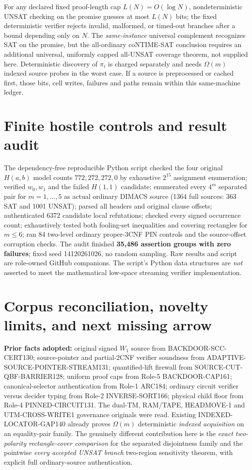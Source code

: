 \documentclass[11pt]{article}
\begin{document}
For any declared fixed proof-length cap $L(N)=O(\log N)$, nondeterministic UNSAT checking on the promise guesses at most $L(N)$ bits; the fixed deterministic verifier rejects invalid, malformed, or timed-out branches after a bound depending only on $N$. The \emph{same-instance} universal complement recognizes SAT on the promise, but the all-ordinary coNTIME-SAT conclusion requires an additional universal, uniformly capped all-UNSAT coverage theorem, not supplied here. Deterministic discovery of $\pi_i$ is charged separately and needs $\Omega(m)$ indexed source probes in the worst case. If a source is preprocessed or cached first, those bits, cell writes, failures and paths remain within this same-machine ledger.

\section{Finite hostile controls and result audit}
The dependency-free reproducible Python script checked the four original $H(a,b)$ model counts $772,272,272,0$ by exhaustive $2^{15}$ assignment enumeration; verified $w_0,w_1$ and the failed $H(1,1)$ candidate; enumerated every $4^m$ separated pair for $m=1,\ldots,5$ as actual ordinary DIMACS source (1364 full sources: 363 SAT and 1001 UNSAT); parsed all headers and original clause offsets; authenticated 6372 candidate local refutations; checked every signed occurrence count; exhaustively tested both fooling-set inequalities and covering rectangles for $m\le6$; ran 84 two-level ordinary proper-3CNF PIN controls and the source-offset corruption checks. The audit finished \textbf{35,486 assertion groups with zero failures}; fixed seed 14120261026, no random sampling. Raw results and script are role-owned GitHub companions. The script's Python data structures are \emph{not} asserted to meet the mathematical low-space streaming verifier implementation.

\section{Corpus reconciliation, novelty limits, and next missing arrow}
\textbf{Prior facts adopted:} original signed $W_1$ source from BACKDOOR-SCC-CERT130; source-pointer and partial-2CNF verifier soundness from ADAPTIVE-SOURCE-POINTER-STREAM131; quantified-lift firewall from SOURCE-CUT-QBF-BARRIER128; uniform proof caps from Role-5 BACKDOOR-CAP161; canonical-selector authentication from Role-1 ARC184; ordinary circuit verifier versus decider typing from Role-2 INVERSE-SORT166; physical child floor from Role-4 PINNED-CIRCUIT131. The dual-TM, RAM/TAPE, HEADMOVE-1 and UTM-CROSS-WRITE1 governance originals were read. Existing INDEXED-LOCATOR-GAP140 already proves $\Omega(m)$ deterministic \emph{indexed acquisition} on an equality-pair family. The genuinely different contribution here is the \emph{exact two-polarity rectangle-cover comparison} for the separated disjointness family and the pointwise \emph{every accepted UNSAT branch} two-region sensitivity theorem, with explicit full ordinary-source authentication.
\end{document}

